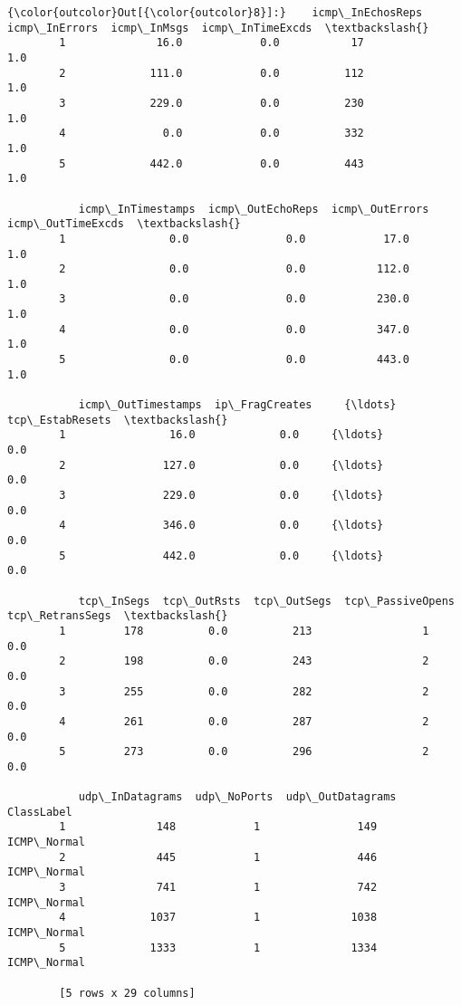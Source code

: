 \documentclass[11pt]{article}
\begin{document}
\begin{Verbatim}[commandchars=\\\{\}]
{\color{outcolor}Out[{\color{outcolor}8}]:}    icmp\_InEchosReps  icmp\_InErrors  icmp\_InMsgs  icmp\_InTimeExcds  \textbackslash{}
        1              16.0            0.0           17               1.0   
        2             111.0            0.0          112               1.0   
        3             229.0            0.0          230               1.0   
        4               0.0            0.0          332               1.0   
        5             442.0            0.0          443               1.0   
        
           icmp\_InTimestamps  icmp\_OutEchoReps  icmp\_OutErrors  icmp\_OutTimeExcds  \textbackslash{}
        1                0.0               0.0            17.0                1.0   
        2                0.0               0.0           112.0                1.0   
        3                0.0               0.0           230.0                1.0   
        4                0.0               0.0           347.0                1.0   
        5                0.0               0.0           443.0                1.0   
        
           icmp\_OutTimestamps  ip\_FragCreates     {\ldots}       tcp\_EstabResets  \textbackslash{}
        1                16.0             0.0     {\ldots}                   0.0   
        2               127.0             0.0     {\ldots}                   0.0   
        3               229.0             0.0     {\ldots}                   0.0   
        4               346.0             0.0     {\ldots}                   0.0   
        5               442.0             0.0     {\ldots}                   0.0   
        
           tcp\_InSegs  tcp\_OutRsts  tcp\_OutSegs  tcp\_PassiveOpens  tcp\_RetransSegs  \textbackslash{}
        1         178          0.0          213                 1              0.0   
        2         198          0.0          243                 2              0.0   
        3         255          0.0          282                 2              0.0   
        4         261          0.0          287                 2              0.0   
        5         273          0.0          296                 2              0.0   
        
           udp\_InDatagrams  udp\_NoPorts  udp\_OutDatagrams   ClassLabel  
        1              148            1               149  ICMP\_Normal  
        2              445            1               446  ICMP\_Normal  
        3              741            1               742  ICMP\_Normal  
        4             1037            1              1038  ICMP\_Normal  
        5             1333            1              1334  ICMP\_Normal  
        
        [5 rows x 29 columns]
\end{Verbatim}
            
\end{document}
